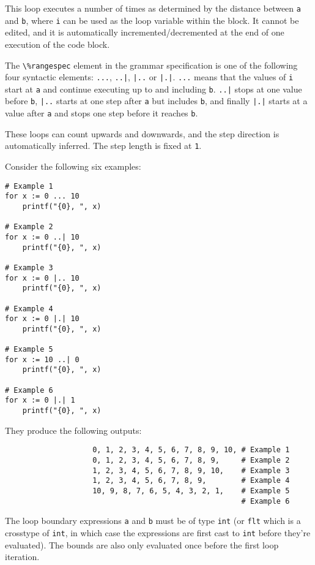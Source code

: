 \documentclass{article}
\newcommand{\code}[1]{\lstinline[columns=fixed]{#1}}
\begin{document}
				This loop executes a number of times as determined by the distance between \code{a} and \code{b}, where \code{i} can be used as the loop variable within the block. It cannot be edited, and it is automatically incremented/decremented at the end of one execution of the code block.
				
				The \code{\%rangespec} element in the grammar specification is one of the following four syntactic elements: \code{...}, \code{..|}, \code{|..} or \code{|.|}. \code{...} means that the values of \code{i} start at \code{a} and continue executing up to and including \code{b}. \code{..|} stops at one value before \code{b}, \code{|..} starts at one step after \code{a} but includes \code{b}, and finally \code{|.|} starts at a value after \code{a} and stops one step before it reaches \code{b}.
				
				These loops can count upwards and downwards, and the step direction is automatically inferred. The step length is fixed at \code{1}.
				
				Consider the following six examples:
				
				\begin{lstlisting}
# Example 1
for x := 0 ... 10
	printf("{0}, ", x)

# Example 2
for x := 0 ..| 10
	printf("{0}, ", x)

# Example 3
for x := 0 |.. 10
	printf("{0}, ", x)

# Example 4
for x := 0 |.| 10
	printf("{0}, ", x)

# Example 5
for x := 10 ..| 0
	printf("{0}, ", x)

# Example 6
for x := 0 |.| 1
	printf("{0}, ", x)
				\end{lstlisting}
				
				They produce the following outputs:
				
				\begin{verbatim}
					0, 1, 2, 3, 4, 5, 6, 7, 8, 9, 10, # Example 1
					0, 1, 2, 3, 4, 5, 6, 7, 8, 9,     # Example 2
					1, 2, 3, 4, 5, 6, 7, 8, 9, 10,    # Example 3
					1, 2, 3, 4, 5, 6, 7, 8, 9,        # Example 4
					10, 9, 8, 7, 6, 5, 4, 3, 2, 1,    # Example 5
					                                  # Example 6
				\end{verbatim}
				
				The loop boundary expressions \code{a} and \code{b} must be of type \code{int} (or \code{flt} which is a crosstype of \code{int}, in which case the expressions are first cast to \code{int} before they're evaluated). The bounds are also only evaluated once before the first loop iteration.
				
\end{document}
